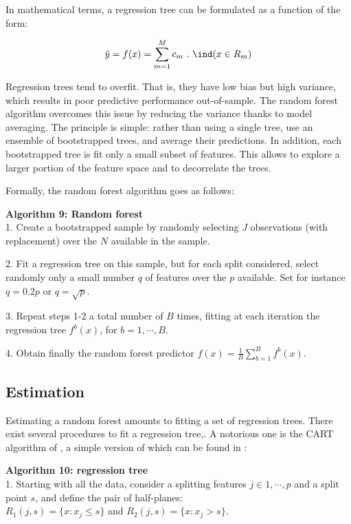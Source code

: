 In mathematical terms, a regression tree can be formulated as a function of the form:

\begin{equation}
\hat{y} = f(x) = \sum_{m=1}^{M}{c_m \ . \ \ind(x \in R_m)}
\label{equation_c3_s8_ss1_1} 
\end{equation}

Regression trees tend to overfit. That is, they have low bias but high variance, which results in poor predictive performance out-of-sample. The random forest algorithm overcomes this issue by reducing the variance thanks to model averaging. The principle is simple: rather than using a single tree, use an ensemble of bootstrapped trees, and average their predictions. In addition, each bootstrapped tree is fit only a small subset of features. This allows to explore a larger portion of the feature space and to decorrelate the trees.

Formally, the random forest algorithm goes as follows:

\textbf{Algorithm 9: Random forest} \vspace{3mm} \\
1. Create a bootstrapped sample by randomly selecting $J$ observations (with replacement) over the $N$ available in the sample.

2. Fit a regression tree on this sample, but for each split considered, select randomly only a small number $q$ of features over the $p$ available. Set for instance $q=0.2 p$ or $q=\sqrt{p}$.

3. Repeat steps 1-2 a total number of $B$ times, fitting at each iteration the regression tree $f^b(x)$, for $b=1, \cdots, B$. 

4. Obtain finally the random forest predictor $f(x) = \frac{1}{B} \sum_{b=1}^{B}{f^b(x)}$.


\subsection{Estimation}
\label{chapter3_section8_subsection2}


Estimating a random forest amounts to fitting a set of regression trees. There exist several procedures to fit a regression tree,. A notorious one is the CART algorithm of \cite{Breiman1984}, a simple version of which can be found in \cite{Hastie2009}:

\newpage

\textbf{Algorithm 10: regression tree} \vspace{3mm} \\
1. Starting with all the data, consider a splitting features $j \in 1, \cdots, p$ and a split point $s$, and define the pair of half-planes: \\
$R_1(j,s) = \{x: x_j \leq s\}$ and $R_2(j,s) = \{x: x_j > s\}$.

